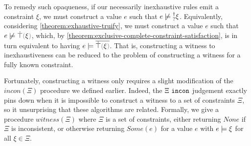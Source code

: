 To remedy such opaqueness, if our necessarily inexhaustive rules emit a constraint $\xi$, we must construct a value $e$ such that $\cnotsatisfyormay{e}{\xi}$. Equivalently, considering \autoref{theorem:exhaustive-truify}, we must construct a value $e$ such that $\cnotsatisfy{e}{\ctruify{\xi}}$, which, by \autoref{theorem:exclusive-complete-constraint-satisfaction}, is in turn equivalent to having $\csatisfy{e}{\cdual{\ctruify{\xi}}}$. That is, constructing a witness to inexhaustiveness can be reduced to the problem of constructing a witness for a fully known constraint.

Fortunately, constructing a witness only requires a slight modification of the $incon(\Xi)$ procedure we defined earlier. Indeed, the $\Xi ~\mathtt{incon}$ judgement exactly pins down when it is impossible to construct a witness to a set of constraints $\Xi$, so it unsurprising that these algorithms are related. Formally, we give a procedure $witness(\Xi)$ where $\Xi$ is a set of constraints, either returning $None$ if $\Xi$ is inconsistent, or otherwise returning $Some(e)$ for a value $e$ with $e \models \xi$ for all $\xi \in \Xi$. 

